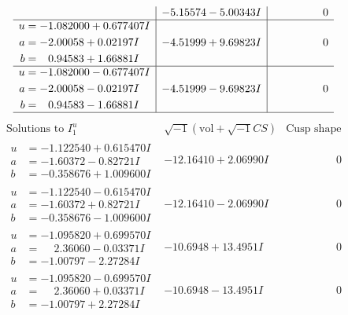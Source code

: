 \documentclass[1p]{elsarticle_modified}
\theoremstyle{definition}
\newcommand{\I}{\sqrt{-1}}
\begin{document}
$$\begin{array}{c|c|c}
 & -5.15574 - 5.00343 I & \phantom{-0.000000 } 0 \\ \hline\begin{aligned}
u &= -1.082000 + 0.677407 I \\
a &= -2.00058 + 0.02197 I \\
b &= \phantom{-}0.94583 + 1.66881 I\end{aligned}
 & -4.51999 + 9.69823 I & \phantom{-0.000000 } 0 \\ \hline\begin{aligned}
u &= -1.082000 - 0.677407 I \\
a &= -2.00058 - 0.02197 I \\
b &= \phantom{-}0.94583 - 1.66881 I\end{aligned}
 & -4.51999 - 9.69823 I & \phantom{-0.000000 } 0\\
 \hline 
 \end{array}$$\newpage$$\begin{array}{c|c|c}  
\text{Solutions to }I^u_{1}& \I (\text{vol} + \sqrt{-1}CS) & \text{Cusp shape}\\
 \hline 
\begin{aligned}
u &= -1.122540 + 0.615470 I \\
a &= -1.60372 - 0.82721 I \\
b &= -0.358676 + 1.009600 I\end{aligned}
 & -12.16410 + 2.06990 I & \phantom{-0.000000 } 0 \\ \hline\begin{aligned}
u &= -1.122540 - 0.615470 I \\
a &= -1.60372 + 0.82721 I \\
b &= -0.358676 - 1.009600 I\end{aligned}
 & -12.16410 - 2.06990 I & \phantom{-0.000000 } 0 \\ \hline\begin{aligned}
u &= -1.095820 + 0.699570 I \\
a &= \phantom{-}2.36060 - 0.03371 I \\
b &= -1.00797 - 2.27284 I\end{aligned}
 & -10.6948 + 13.4951 I & \phantom{-0.000000 } 0 \\ \hline\begin{aligned}
u &= -1.095820 - 0.699570 I \\
a &= \phantom{-}2.36060 + 0.03371 I \\
b &= -1.00797 + 2.27284 I\end{aligned}
 & -10.6948 - 13.4951 I & \phantom{-0.000000 } 0 \\ \hline\begin{aligned}

\end{aligned}
\end{array}$$
\end{document}
